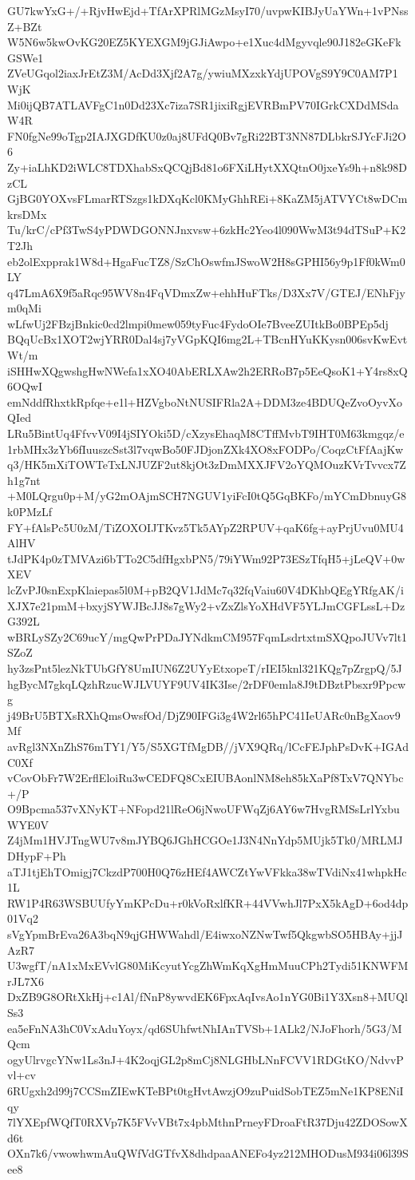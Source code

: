 GU7kwYxG+/+RjvHwEjd+TfArXPRlMGzMsyI70/uvpwKIBJyUaYWn+1vPNssZ+BZt
W5N6w5kwOvKG20EZ5KYEXGM9jGJiAwpo+e1Xuc4dMgyvqle90J182eGKeFkGSWe1
ZVeUGqol2iaxJrEtZ3M/AcDd3Xjf2A7g/ywiuMXzxkYdjUPOVgS9Y9C0AM7P1WjK
Mi0ijQB7ATLAVFgC1n0Dd23Xc7iza7SR1jixiRgjEVRBmPV70IGrkCXDdMSdaW4R
FN0fgNe99oTgp2IAJXGDfKU0z0aj8UFdQ0Bv7gRi22BT3NN87DLbkrSJYcFJi2O6
Zy+iaLhKD2iWLC8TDXhabSxQCQjBd81o6FXiLHytXXQtnO0jxeYs9h+n8k98DzCL
GjBG0YOXvsFLmarRTSzgs1kDXqKcl0KMyGhhREi+8KaZM5jATVYCt8wDCmkrsDMx
Tu/krC/cPf3TwS4yPDWDGONNJnxvsw+6zkHc2Yeo4l090WwM3t94dTSuP+K2T2Jh
eb2olExpprak1W8d+HgaFucTZ8/SzChOswfmJSwoW2H8sGPHI56y9p1Ff0kWm0LY
q47LmA6X9f5aRqc95WV8n4FqVDmxZw+ehhHuFTks/D3Xx7V/GTEJ/ENhFjym0qMi
wLfwUj2FBzjBnkic0cd2lmpi0mew059tyFuc4FydoOIe7BveeZUItkBo0BPEp5dj
BQqUcBx1XOT2wjYRR0Dal4sj7yVGpKQI6mg2L+TBcnHYuKKysn006svKwEvtWt/m
iSHHwXQgwshgHwNWefa1xXO40AbERLXAw2h2ERRoB7p5EeQsoK1+Y4rs8xQ6OQwI
emNddfRhxtkRpfqe+e1l+HZVgboNtNUSIFRla2A+DDM3ze4BDUQeZvoOyvXoQIed
LRu5BintUq4FfvvV09I4jSIYOki5D/cXzysEhaqM8CTffMvbT9IHT0M63kmgqz/e
1rbMHx3zYb6fIuuszcSst3l7vqwBo50FJDjonZXk4XO8xFODPo/CoqzCtFfAajKw
q3/HK5mXiTOWTeTxLNJUZF2ut8kjOt3zDmMXXJFV2oYQMOuzKVrTvvcx7Zh1g7nt
+M0LQrgu0p+M/yG2mOAjmSCH7NGUV1yiFcI0tQ5GqBKFo/mYCmDbnuyG8k0PMzLf
FY+fAlsPc5U0zM/TiZOXOIJTKvz5Tk5AYpZ2RPUV+qaK6fg+ayPrjUvu0MU4AlHV
tJdPK4p0zTMVAzi6bTTo2C5dfHgxbPN5/79iYWm92P73ESzTfqH5+jLeQV+0wXEV
lcZvPJ0snExpKlaiepas5l0M+pB2QV1JdMc7q32fqVaiu60V4DKhbQEgYRfgAK/i
XJX7e21pmM+bxyjSYWJBcJJ8s7gWy2+vZxZlsYoXHdVF5YLJmCGFLssL+DzG392L
wBRLySZy2C69ucY/mgQwPrPDaJYNdkmCM957FqmLsdrtxtmSXQpoJUVv7lt1SZoZ
hy3zsPnt5lezNkTUbGfY8UmIUN6Z2UYyEtxopeT/rIEI5knl321KQg7pZrgpQ/5J
hgBycM7gkqLQzhRzucWJLVUYF9UV4IK3Ise/2rDF0emla8J9tDBztPbsxr9Ppcwg
j49BrU5BTXsRXhQmsOwsfOd/DjZ90IFGi3g4W2rl65hPC41IeUARc0nBgXaov9Mf
avRgl3NXnZhS76mTY1/Y5/S5XGTfMgDB//jVX9QRq/lCcFEJphPsDvK+IGAdC0Xf
vCovObFr7W2ErflEloiRu3wCEDFQ8CxEIUBAonlNM8eh85kXaPf8TxV7QNYbc+/P
O9Bpcma537vXNyKT+NFopd21lReO6jNwoUFWqZj6AY6w7HvgRMSsLrlYxbuWYE0V
Z4jMm1HVJTngWU7v8mJYBQ6JGhHCGOe1J3N4NnYdp5MUjk5Tk0/MRLMJDHypF+Ph
aTJ1tjEhTOmigj7CkzdP700H0Q76zHEf4AWCZtYwVFkka38wTVdiNx41whpkHc1L
RW1P4R63WSBUUfyYmKPcDu+r0kVoRxlfKR+44VVwhJl7PxX5kAgD+6od4dp01Vq2
sVgYpmBrEva26A3bqN9qjGHWWahdl/E4iwxoNZNwTwf5QkgwbSO5HBAy+jjJAzR7
U3wgfT/nA1xMxEVvlG80MiKcyutYcgZhWmKqXgHmMuuCPh2Tydi51KNWFMrJL7X6
DxZB9G8ORtXkHj+c1Al/fNnP8ywvdEK6FpxAqIvsAo1nYG0Bi1Y3Xsn8+MUQlSs3
ea5eFnNA3hC0VxAduYoyx/qd6SUhfwtNhIAnTVSb+1ALk2/NJoFhorh/5G3/MQcm
ogyUlrvgcYNw1Ls3nJ+4K2oqjGL2p8mCj8NLGHbLNnFCVV1RDGtKO/NdvvPvl+cv
6RUgxh2d99j7CCSmZIEwKTeBPt0tgHvtAwzjO9zuPuidSobTEZ5mNe1KP8ENiIqy
7lYXEpfWQfT0RXVp7K5FVvVBt7x4pbMthnPrneyFDroaFtR37Dju42ZDOSowXd6t
OXn7k6/vwowhwmAuQWfVdGTfvX8dhdpaaANEFo4yz212MHODusM934i06l39See8
